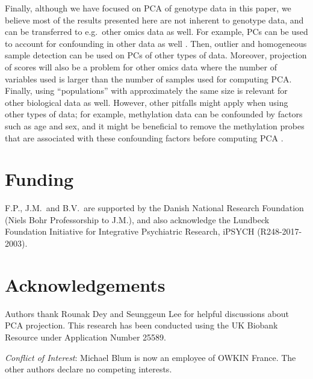 \documentclass{bioinfo}
\begin{document}
Finally, although we have focused on PCA of genotype data in this paper, we believe most of the results presented here are not inherent to genotype data, and can be transferred to e.g.\ other omics data as well. For example, PCs can be used to account for confounding in other data as well \cite[]{pickrell2010understanding}. Then, outlier and homogeneous sample detection can be used on PCs of other types of data. Moreover, projection of scores will also be a problem for other omics data where the number of variables used is larger than the number of samples used for computing PCA. Finally, using ``populations'' with approximately the same size is relevant for other biological data as well.
However, other pitfalls might apply when using other types of data; for example, methylation data can be confounded by factors such as age and sex, and it might be beneficial to remove the methylation probes that are associated with these confounding factors before computing PCA \cite[]{decamps2019guidelines}.


\section*{Funding}

F.P., J.M.\ and B.V.\ are supported by the Danish National Research Foundation (Niels Bohr Professorship to J.M.), and also acknowledge the Lundbeck Foundation Initiative for Integrative Psychiatric Research, iPSYCH (R248-2017-2003).

\section*{Acknowledgements}

Authors thank Rounak Dey and Seunggeun Lee for helpful discussions about PCA projection.
This research has been conducted using the UK Biobank Resource under Application Number 25589.

\vspace*{1em}

\noindent\textit{Conflict of Interest}: Michael Blum is now an employee of OWKIN France.
The other authors declare no competing interests.



%
%
\end{document}
